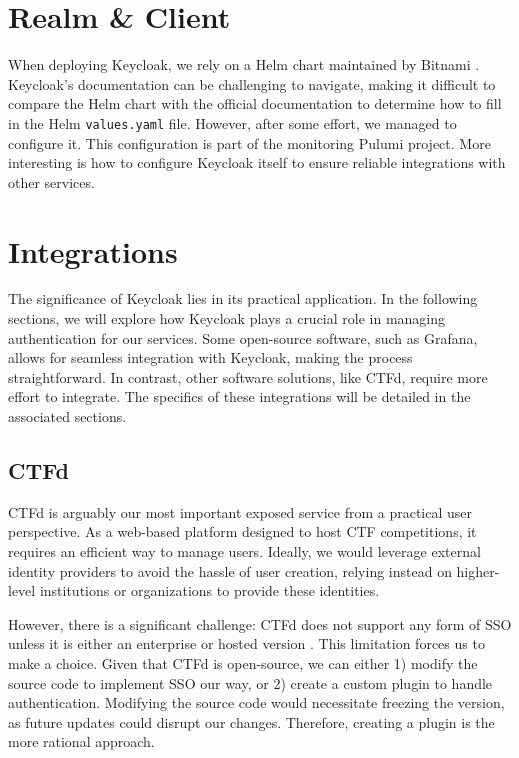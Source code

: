 \section{Realm \& Client}
When deploying Keycloak, we rely on a Helm chart maintained by Bitnami \parencite{bitnami_keycloak}. Keycloak's documentation can be challenging to navigate, making it difficult to compare the Helm chart with the official documentation to determine how to fill in the Helm \texttt{values.yaml} file. However, after some effort, we managed to configure it. This configuration is part of the monitoring Pulumi project. More interesting is how to configure Keycloak itself to ensure reliable integrations with other services.

\newpage

\section{Integrations}
The significance of Keycloak lies in its practical application. In the following sections, we will explore how Keycloak plays a crucial role in managing authentication for our services. Some open-source software, such as Grafana, allows for seamless integration with Keycloak, making the process straightforward. In contrast, other software solutions, like CTFd, require more effort to integrate. The specifics of these integrations will be detailed in the associated sections.

\subsection{CTFd}
CTFd is arguably our most important exposed service from a practical user perspective. As a web-based platform designed to host CTF competitions, it requires an efficient way to manage users. Ideally, we would leverage external identity providers to avoid the hassle of user creation, relying instead on higher-level institutions or organizations to provide these identities.

However, there is a significant challenge: CTFd does not support any form of SSO unless it is either an enterprise or hosted version \parencite{ctfd_sso}. This limitation forces us to make a choice. Given that CTFd is open-source, we can either 1) modify the source code to implement SSO our way, or 2) create a custom plugin to handle authentication. Modifying the source code would necessitate freezing the version, as future updates could disrupt our changes. Therefore, creating a plugin is the more rational approach.

